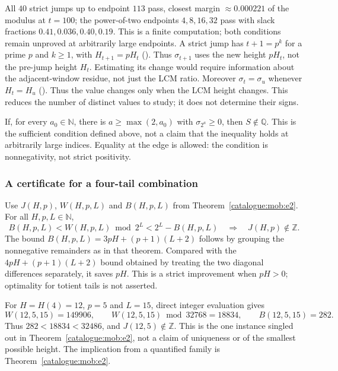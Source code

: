 \begin{rem}
All $40$ strict jumps up to endpoint $113$ pass, closest margin
$\approx 0.000221$ of the modulus at $t=100$; the power-of-two endpoints $4,8,16,32$ pass with
slack fractions $0.41,0.036,0.40,0.19$. This is a finite computation; both
conditions remain unproved at arbitrarily large endpoints.
A strict jump has $t+1=p^k$ for a prime $p$ and $k\ge1$, with
$H_{t+1}=pH_t$
(). Thus $\sigma_{t+1}$ uses the new height $pH_t$,
not the pre-jump height $H_t$. Estimating its change would require
information about the adjacent-window residue, not just the LCM ratio.
Moreover $\sigma_t=\sigma_u$ whenever $H_t=H_u$
().
Thus the value changes
only when the LCM height changes. This reduces the number of distinct
values to study; it does not determine their signs.
\end{rem}

\begin{prop}\label{prop:sufficient-inequality}
If, for every $a_0\in\mathbb N$, there is $a\ge\max(2,a_0)$ with
$\sigma_{2^a}\ge0$, then $S\notin\mathbb Q$.
This is the sufficient condition defined above, not a claim that the
inequality holds at arbitrarily large indices. Equality at the edge
is allowed: the condition is nonnegativity, not strict positivity.
\end{prop}

\subsubsection{A certificate for a four-tail combination}

\begin{thm}\label{thm:certificate-four-tail-combination}
Use $J(H,p)$, $W(H,p,L)$ and $B(H,p,L)$ from
Theorem~\ref{catalogue:mob:e2}. For all $H,p,L\in\mathbb N$,
\[
 B(H,p,L)<W(H,p,L)\bmod2^L<2^L-B(H,p,L)
 \quad\Longrightarrow\quad J(H,p)\notin\mathbb Z.
\]
The bound $B(H,p,L)=3pH+(p+1)(L+2)$ follows by grouping the
nonnegative remainders as in that theorem. Compared with the
$4pH+(p+1)(L+2)$ bound obtained by treating the two diagonal
differences separately, it saves $pH$. This is a strict improvement
when $pH>0$; optimality for totient tails is not asserted.
\end{thm}

\begin{thm}\label{thm:one-explicit-witness}
For $H=H(4)=12$, $p=5$ and $L=15$, direct integer evaluation gives
\[
 W(12,5,15)=149906,\qquad
 W(12,5,15)\bmod32768=18834,\qquad B(12,5,15)=282.
\]
Thus $282<18834<32486$, and $J(12,5)\notin\mathbb Z$.
This is the one instance singled out in Theorem~\ref{catalogue:mob:e2}, not a
claim of uniqueness or of the smallest possible height. The implication
from a quantified family is Theorem~\ref{catalogue:mob:e2}.
\end{thm}

